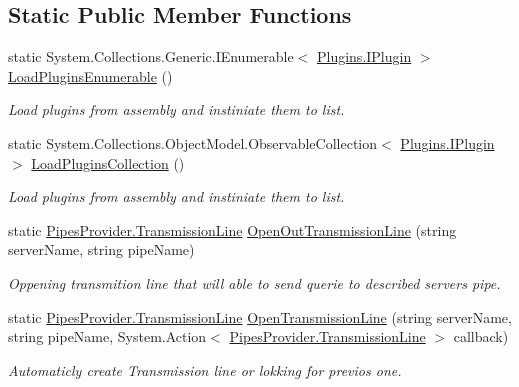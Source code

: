 \subsection*{Static Public Member Functions}
\begin{DoxyCompactItemize}
\item 
static System.\+Collections.\+Generic.\+I\+Enumerable$<$ \mbox{\hyperlink{interface_uniform_client_1_1_plugins_1_1_i_plugin}{Plugins.\+I\+Plugin}} $>$ \mbox{\hyperlink{class_uniform_client_1_1_base_client_aa60dbfa5bd8c46659aec7738193315f1}{Load\+Plugins\+Enumerable}} ()
\begin{DoxyCompactList}\small\item\em Load plugins from assembly and instiniate them to list. \end{DoxyCompactList}\item 
static System.\+Collections.\+Object\+Model.\+Observable\+Collection$<$ \mbox{\hyperlink{interface_uniform_client_1_1_plugins_1_1_i_plugin}{Plugins.\+I\+Plugin}} $>$ \mbox{\hyperlink{class_uniform_client_1_1_base_client_a99ae0bb1dd5bef374fcedb3f873bfe8b}{Load\+Plugins\+Collection}} ()
\begin{DoxyCompactList}\small\item\em Load plugins from assembly and instiniate them to list. \end{DoxyCompactList}\item 
static \mbox{\hyperlink{class_pipes_provider_1_1_transmission_line}{Pipes\+Provider.\+Transmission\+Line}} \mbox{\hyperlink{class_uniform_client_1_1_base_client_aaeab527820b088ab3a84cd210e53a01f}{Open\+Out\+Transmission\+Line}} (string server\+Name, string pipe\+Name)
\begin{DoxyCompactList}\small\item\em Oppening transmition line that will able to send querie to described server\textquotesingle{}s pipe. \end{DoxyCompactList}\item 
static \mbox{\hyperlink{class_pipes_provider_1_1_transmission_line}{Pipes\+Provider.\+Transmission\+Line}} \mbox{\hyperlink{class_uniform_client_1_1_base_client_a9044693efc8f4ccf259e954c5345236f}{Open\+Transmission\+Line}} (string server\+Name, string pipe\+Name, System.\+Action$<$ \mbox{\hyperlink{class_pipes_provider_1_1_transmission_line}{Pipes\+Provider.\+Transmission\+Line}} $>$ callback)
\begin{DoxyCompactList}\small\item\em Automaticly create Transmission line or lokking for previos one. \end{DoxyCompactList}\item 

\end{DoxyCompactItemize}
